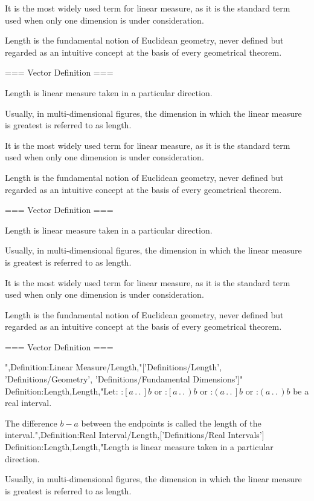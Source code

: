 It is the most widely used term for linear measure, as it is the standard term used when only one dimension is under consideration.


Length is the fundamental notion of Euclidean geometry, never defined but regarded as an intuitive concept at the basis of every geometrical theorem.


=== Vector Definition ===

Length is linear measure taken in a particular direction.

Usually, in multi-dimensional figures, the dimension in which the linear measure is greatest is referred to as length.

It is the most widely used term for linear measure, as it is the standard term used when only one dimension is under consideration.


Length is the fundamental notion of Euclidean geometry, never defined but regarded as an intuitive concept at the basis of every geometrical theorem.


=== Vector Definition ===

Length is linear measure taken in a particular direction.

Usually, in multi-dimensional figures, the dimension in which the linear measure is greatest is referred to as length.

It is the most widely used term for linear measure, as it is the standard term used when only one dimension is under consideration.


Length is the fundamental notion of Euclidean geometry, never defined but regarded as an intuitive concept at the basis of every geometrical theorem.


=== Vector Definition ===

",Definition:Linear Measure/Length,"['Definitions/Length', 'Definitions/Geometry', 'Definitions/Fundamental Dimensions']"
Definition:Length,Length,"Let:
:$\left[ a \,.\,.\,   \right]b$
or
:$\left[ a \,.\,.\,   \right)b$
or
:$\left( a \,.\,.\,   \right]b$
or
:$\left( a \,.\,.\,   \right)b$
be a real interval.


The difference $b - a$ between the endpoints is called the length of the interval.",Definition:Real Interval/Length,['Definitions/Real Intervals']
Definition:Length,Length,"Length is linear measure taken in a particular direction.

Usually, in multi-dimensional figures, the dimension in which the linear measure is greatest is referred to as length.

